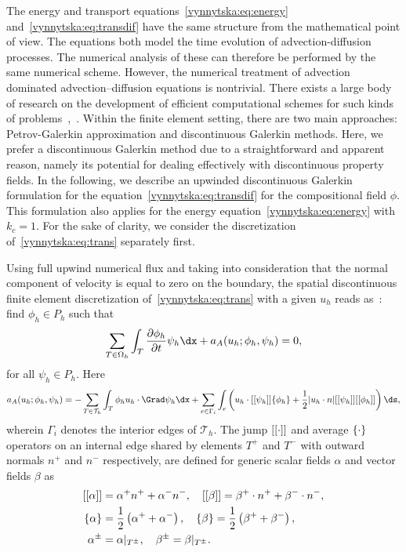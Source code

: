 The energy and transport equations~\eqref{vynnytska:eq:energy}
and~\eqref{vynnytska:eq:transdif} have the same structure from the
mathematical point of view. The equations both model the time
evolution of advection-diffusion processes. The numerical analysis of
these can therefore be performed by the same numerical
scheme. However, the numerical treatment of advection dominated
advection--diffusion equations is nontrivial. There exists a large
body of research on the development of efficient computational schemes
for such kinds of
problems~\citep{Lin2006},~\citep{ZienkiewiczTaylor2000}.  Within the
finite element setting, there are two main approaches: Petrov-Galerkin
approximation and discontinuous Galerkin methods. Here, we prefer a
discontinuous Galerkin method due to a straightforward and apparent
reason, namely its potential for dealing effectively with
discontinuous property fields. In the following, we describe an
upwinded discontinuous Galerkin formulation for the
equation~\eqref{vynnytska:eq:transdif} for the compositional field
$\phi$. This formulation also applies for the energy
equation~\eqref{vynnytska:eq:energy} with $k_c = 1$. For the sake of
clarity, we consider the discretization of~\eqref{vynnytska:eq:trans}
separately first.

Using full upwind numerical flux and taking into consideration that
the normal component of velocity is equal to zero on the boundary, the
spatial discontinuous finite element discretization
of~\eqref{vynnytska:eq:trans} with a given $u_h$ reads
as~\citep{PietroLoForteParolini2006}: find $\phi_h \in P_h$ such that
\begin{equation}
  \sum_{T \in \Omega_h} \int_T \frac{\partial \phi_h}{\partial t} \psi_h
  \dx + a_{A} (u_h; \phi_h, \psi_h) = 0,
\end{equation}
for all $\psi_h \in P_h$. Here
\begin{equation}
  \label{vynnytska:eq:dgadv}
   a_{A} (u_h; \phi_h, \psi_h )
   =
   - \sum_{T \in \mathcal{T}_h} \int_T \phi_h u_h \cdot \Grad \psi_h \dx
   + \sum_{e \in \Gamma_i} \int_{e} \left (
   u_h \cdot \jump{\psi_h} \avg{\phi_h} + \frac{1}{2}
   | u_h \cdot n | \jump{\psi_h} \jump{\phi_h} \right ) \ds,
\end{equation}
wherein $\Gamma_i$ denotes the interior edges of $\mathcal{T}_h$. The
jump $[[\cdot]]$ and average $\{\cdot\}$ operators on an internal
edge shared by elements $T^{+}$ and $T^{-}$ with outward normals $n^+$
and $n^-$ respectively, are defined for generic scalar fields $\alpha$
and vector fields $\beta$ as
\begin{align}
  [[\alpha]]&= \alpha^{+} n^{+} + \alpha^{-} n^{-}, \quad
  [[\beta]]  = \beta^{+} \cdot n^{+} + \beta^{-} \cdot n^{-}, \\
  \{\alpha\} &= \frac{1}{2} \left( \alpha^{+} + \alpha^{-} \right), \quad
  \{\beta\}   = \frac{1}{2} \left( \beta^{+} + \beta^{-} \right), \\
  \alpha^{\pm}  &= \alpha |_{T^{\pm}}, \quad
  \beta^{\pm}    = \beta |_{T^{\pm}}.
\end{align}

